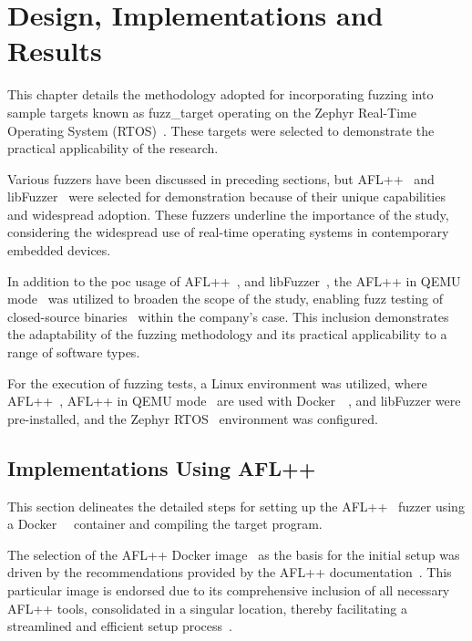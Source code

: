 \vspace{21.5pt}
\chapter{Design, Implementations and Results}

This chapter details the methodology adopted for incorporating fuzzing into
sample targets known as \gls{fuzz_target} operating on the Zephyr Real-Time Operating System
(RTOS)~\cite{Security75:online}. These targets were selected to demonstrate the
practical applicability of the research.

Various fuzzers have been discussed in preceding sections, but
AFL++~\cite{257204} and libFuzzer~\cite{libFuzze17:online} were selected for
demonstration because of their unique capabilities and widespread adoption.
These fuzzers underline the importance of the study, considering the widespread
use of real-time operating systems in contemporary embedded devices.

In addition to the \acrlong{poc} usage of AFL++~\cite{257204}, and libFuzzer~\cite{libFuzze17:online}, the
AFL++ in QEMU mode~\cite{AFLplusp57:online} was utilized to broaden the scope of
the study, enabling fuzz testing of closed-source binaries~\cite{nagy2021breaking} within the company's case.
This inclusion demonstrates the adaptability of the fuzzing methodology and its
practical applicability to a range of software types.

For the execution of fuzzing tests, a Linux environment was utilized, where
AFL++~\cite{257204}, AFL++ in QEMU mode~\cite{AFLplusp57:online} are used with Docker~\cite{anderson2015docker}~\cite{aflplusp99:online},
and libFuzzer\cite{libFuzze17:online} were pre-installed, and the Zephyr RTOS~\cite{Security75:online}
environment was configured.


\section{Implementations Using AFL++}
This section delineates the detailed steps for setting up the
AFL++~\cite{257204} fuzzer using a Docker~\cite{anderson2015docker}~\cite{aflplusp99:online}
container and compiling the target program.

The selection of the AFL++ Docker image~\cite{aflplusp99:online} as the basis for the initial setup was
driven by the recommendations provided by the AFL++ documentation~\cite{GitHubAF78:online}. This particular
image is endorsed due to its comprehensive inclusion of all necessary AFL++ tools,
consolidated in a singular location, thereby facilitating a streamlined
and efficient setup process~\cite{257204}.


